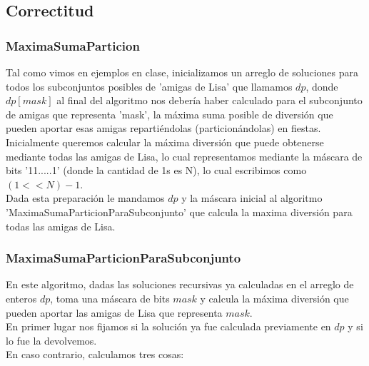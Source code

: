 \subsection{Correctitud}

\subsubsection*{MaximaSumaParticion}
Tal como vimos en ejemplos en clase, inicializamos un arreglo de soluciones para todos los subconjuntos posibles de 'amigas de Lisa' que llamamos $dp$, donde $dp[mask]$ al final del algoritmo nos debería haber calculado para el subconjunto de amigas que representa 'mask', la máxima suma posible de diversión que pueden aportar esas amigas repartiéndolas (particionándolas) en fiestas. \\
Inicialmente queremos calcular la máxima diversión que puede obtenerse mediante todas las amigas de Lisa, lo cual representamos mediante la máscara de bits '11.....1' (donde la cantidad de 1s es N), lo cual escribimos como $(1<<N)-1$. \\
Dada esta preparación le mandamos $dp$ y la máscara inicial al algoritmo 'MaximaSumaParticionParaSubconjunto' que calcula la maxima diversión para todas las amigas de Lisa.

\subsubsection*{MaximaSumaParticionParaSubconjunto}

En este algoritmo, dadas las soluciones recursivas ya calculadas en el arreglo de enteros $dp$, toma una máscara de bits $mask$ y calcula la máxima diversión que pueden aportar las amigas de Lisa que representa $mask$. \\
En primer lugar nos fijamos si la solución ya fue calculada previamente en $dp$ y si lo fue la devolvemos. \\
En caso contrario, calculamos tres cosas:

